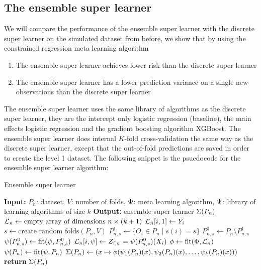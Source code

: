 \documentclass[./main.tex]{subfiles}
\begin{document}
\subsection{The ensemble super learner}
We will compare the performance of the ensemble super learner with the discrete super learner on the simulated dataset from before, we show that by using the constrained regression meta learning algorithm
\begin{enumerate}
    \item The ensemble super learner achieves lower risk than the discrete super learner
    \item The ensemble super learner has a lower prediction variance on a single new observations than the discrete super learner
\end{enumerate}
The ensemble super learner uses the same library of algorithms as the discrete super learner, they are the intercept only logistic regression (baseline), the main effects logistic regression and the gradient boosting algorithm XGBoost. The ensemble super learner does internal $ K $-fold cross-validation the same way as the discrete super learner, except that the out-of-fold predictions are saved in order to create the level 1 dataset. The following snippet is the psuedocode for the ensemble super learner algorithm:
\begin{algorithm}[H]
\caption{Ensemble super learner}
\begin{algorithmic}[1]
\State \textbf{Input:} $P_n$: dataset, $V$: number of folds, $ \Phi $: meta learning algorithm, $ \Psi $: library of learning algorithms of size $ k $
\State \textbf{Output:} ensemble super learner $ \Sigma(P_n) $
\State $\mathcal{L}_n \gets \text{empty array of dimensions } n \times (k+1)$  
\State $ \mathcal{L}_n[i, 1] \gets Y_i $ 
\State $s \gets \text{create random folds}(P_n, V)$ 
    \State $P_{n, s}^{1} \gets \{O_i \in P_n \mid s(i) = s\} $
    \State $P_{n, s}^{0} \gets P_n \setminus P_{n,s}^{1} $
    \For{$\la \in \lib$}
        \State $ \psi(P_{n,s}^{0}) \gets \text{fit}(\psi, P_{n, s}^{0})$
            \State $ \mathcal{L}_n[i, \psi] \gets Z_{i, \psi} = \psi(P_{n,s}^{0})(X_i) $ 
        \EndFor
    \EndFor
\EndFor
\State $ \phi \gets \text{fit}(\Phi, \mathcal{L}_n) $ 
\For{$\la \in \lib$}
    \State $ \psi(P_{n}) \gets \text{fit}(\psi, P_{n})$ 
\EndFor
\State $ \Sigma(P_n) \gets (x \mapsto \phi(\psi_1(P_n)(x), \psi_2(P_n)(x), \dots , \psi_{k}(P_n)(x))) $ 
\State \textbf{return} $ \Sigma(P_n) $
\end{algorithmic}
\end{algorithm}
\end{document}
